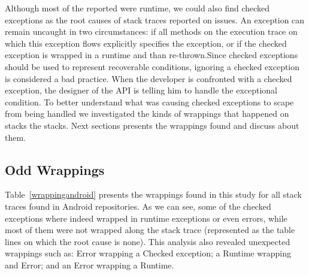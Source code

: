\documentclass[conference]{IEEEtran}
\begin{document}
Although most of the reported were runtime, we could also find checked
exceptions as the root causes of stack traces reported on issues. An exception
can remain uncaught in two circumstances: if all methods on the execution trace
on which this exception flows explicitly specifies the exception, or if the
checked exception is wrapped in a runtime and than re-thrown.Since checked
exceptions should be used to represent recoverable conditions, ignoring a
checked exception is considered a bad practice. When the developer is confronted
with a checked exception, the designer of the API is telling him to handle the
exceptional condition. To better understand what was causing checked exceptions
to scape from being handled we investigated the kinds of wrappings that happened
on stacks the stacks.  Next sections presents the wrappings found and discuss
about them.

\subsection{Odd Wrappings}

Table~\ref{wrappingandroid} presents the wrappings found in this study for all
stack traces found in Android repositories. As we can see, some of the checked
exceptions where indeed wrapped in runtime exceptions or even errors, while most
of them were not wrapped along the stack trace (represented as the table lines
on which the root cause is none). This analysis also revealed unexpected
wrappings such as: Error wrapping a Checked exception; a Runtime wrapping and
Error; and an Error wrapping a Runtime.
\end{document}
